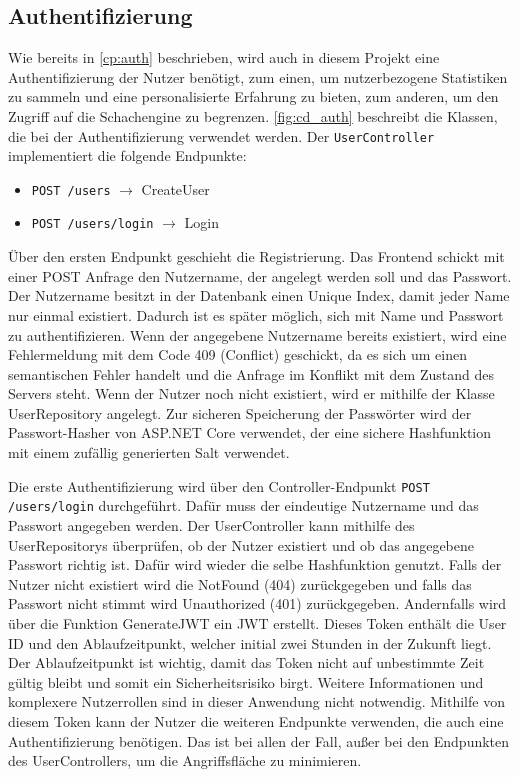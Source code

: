\subsection{Authentifizierung}
Wie bereits in \autoref{cp:auth} beschrieben, wird auch in diesem Projekt eine Authentifizierung der Nutzer benötigt, zum einen, um nutzerbezogene Statistiken zu sammeln und eine personalisierte Erfahrung zu bieten, zum anderen, um den Zugriff auf die Schachengine zu begrenzen. \autoref{fig:cd_auth} beschreibt die Klassen, die bei der Authentifizierung verwendet werden. Der \lstinline{UserController} implementiert die folgende Endpunkte:

\begin{itemize}
    \item \lstinline{POST /users} $\rightarrow$ CreateUser
    \item \lstinline{POST /users/login} $\rightarrow$ Login
\end{itemize}

Über den ersten Endpunkt geschieht die Registrierung. Das Frontend schickt mit einer POST Anfrage den Nutzername, der angelegt werden soll und das Passwort. Der Nutzername besitzt in der Datenbank einen Unique Index, damit jeder Name nur einmal existiert. Dadurch ist es später möglich, sich mit Name und Passwort zu authentifizieren.
Wenn der angegebene Nutzername bereits existiert, wird eine Fehlermeldung mit dem Code 409 (Conflict) geschickt, da es sich um einen semantischen Fehler handelt und die Anfrage im Konflikt mit dem Zustand des Servers steht. %
Wenn der Nutzer noch nicht existiert, wird er mithilfe der Klasse UserRepository angelegt.
Zur sicheren Speicherung der Passwörter wird der Passwort-Hasher von ASP.NET Core verwendet, der eine sichere Hashfunktion mit einem zufällig generierten Salt verwendet.

Die erste Authentifizierung wird über den Controller-Endpunkt \lstinline{POST /users/login} durchgeführt. Dafür muss der eindeutige Nutzername und das Passwort angegeben werden. Der UserController kann mithilfe des UserRepositorys überprüfen, ob der Nutzer existiert und ob das angegebene Passwort richtig ist. Dafür wird wieder die selbe Hashfunktion genutzt.
Falls der Nutzer nicht existiert wird die NotFound (404) zurückgegeben und falls das Passwort nicht stimmt wird Unauthorized (401) zurückgegeben.
Andernfalls wird über die Funktion GenerateJWT ein \ac{JWT} erstellt. Dieses Token enthält die User ID und den Ablaufzeitpunkt, welcher initial zwei Stunden in der Zukunft liegt. Der Ablaufzeitpunkt ist wichtig, damit das Token nicht auf unbestimmte Zeit gültig bleibt und somit ein Sicherheitsrisiko birgt. Weitere Informationen und komplexere Nutzerrollen sind in dieser Anwendung nicht notwendig. Mithilfe von diesem Token kann der Nutzer die weiteren Endpunkte verwenden, die auch eine Authentifizierung benötigen. Das ist bei allen der Fall, außer bei den Endpunkten des UserControllers, um die Angriffsfläche zu minimieren.

